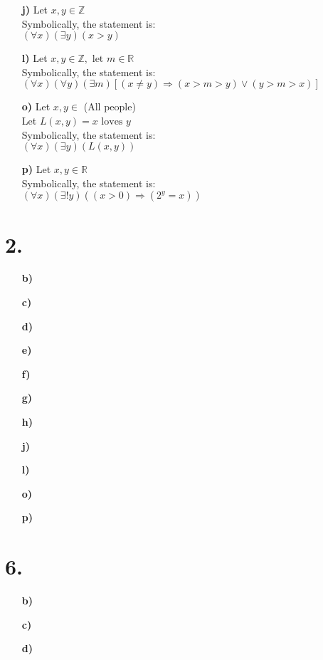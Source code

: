 \documentclass[12pt,letterpaper]{article}
\begin{document}
\begin{enumerate}[label= \textbf{\alph*)}]
	\item[\textbf{j)}] Let $x, y \in \mathbb{Z}$\\
						Symbolically, the statement is:\\
						$(\forall x)(\exists y)(x > y)$ 
	\item[\textbf{l)}] Let $x, y \in \mathbb{Z}, \text{ let } m \in \mathbb{R}$\\
						Symbolically, the statement is:\\
						$(\forall x)(\forall y)(\exists m)[(x \neq y) \Rightarrow (x > m > y) \lor (y > m > x)]$ 
	\item[\textbf{o)}] Let $x, y \in$ (All people)\\
						Let $L(x, y) = x \text{ loves } y$\\
						Symbolically, the statement is:\\
						$(\forall x)(\exists y) (L(x,y))$
	\item[\textbf{p)}] Let $x, y \in \mathbb{R}$\\
						Symbolically, the statement is:\\
						$(\forall x)(\exists! y)((x > 0) \Rightarrow (2^y=x))$ 
\end{enumerate}


\section*{2.}
\begin{enumerate}[label= \textbf{\alph*)}]
	\item[\textbf{b)}]
	\item[\textbf{c)}]
	\item[\textbf{d)}]
	\item[\textbf{e)}]
	\item[\textbf{f)}]
	\item[\textbf{g)}]
	\item[\textbf{h)}]
	\item[\textbf{j)}] 
	\item[\textbf{l)}]  
	\item[\textbf{o)}]
	\item[\textbf{p)}]
\end{enumerate}

\section*{6.}
\begin{enumerate}[label= \textbf{\alph*)}]
	\item[\textbf{b)}]
	\item[\textbf{c)}]
	\item[\textbf{d)}]  
\end{enumerate}
\end{document}
